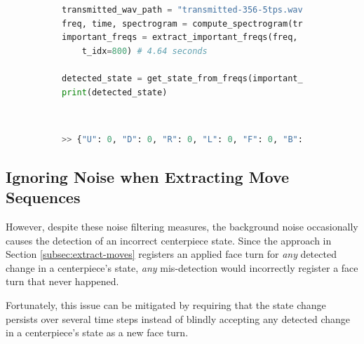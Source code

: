 \begin{figure}[h]
\caption{Example: Refined conversion of peak frequencies to states}
\label{fig:code-get-state-from-freqs-new-demo}
\begin{subfigure}{\textwidth}
\begin{lstlisting}[language=Python]
transmitted_wav_path = "transmitted-356-5tps.wav"
freq, time, spectrogram = compute_spectrogram(transmitted_wav_path)
important_freqs = extract_important_freqs(freq, time, spectrogram,
    t_idx=800) # 4.64 seconds

detected_state = get_state_from_freqs(important_freqs)
print(detected_state)
\end{lstlisting}
\end{subfigure}\\

\begin{subfigure}{\textwidth}
\begin{lstlisting}[language=Python, numbers=none]
>> {"U": 0, "D": 0, "R": 0, "L": 0, "F": 0, "B": 0}
\end{lstlisting}
\end{subfigure}
\end{figure}

\newpage
\subsection{Ignoring Noise when Extracting Move Sequences}
\label{subsec:ignoring-noise-when-extracting-move-sequences}

However, despite these noise filtering measures, the background noise
occasionally causes the detection of an incorrect centerpiece state.
Since the approach in Section \ref{subsec:extract-moves} registers an
applied face turn for \emph{any} detected change in a centerpiece's
state, \emph{any} mis-detection would incorrectly register a face turn
that never happened.

Fortunately, this issue can be mitigated by requiring that the state
change persists over several time steps instead of blindly accepting
any detected change in a centerpiece's state as a new face turn.


